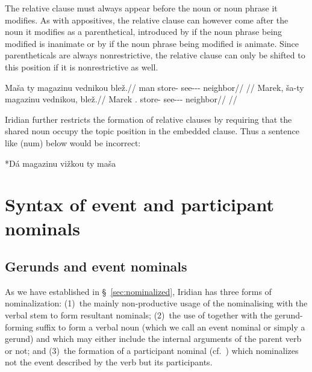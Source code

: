 The relative clause must always appear before the noun or noun phrase it
modifies. As with appositives, the relative clause can however come after the
noun it modifies as a parenthetical, introduced by  if the noun
phrase being modified is inanimate or by  if the noun phrase being
modified is animate. Since parentheticals are always nonrestrictive, the
relative clause can only be shifted to this position if it is nonrestrictive as
well.

\pex
\a\begingl
  \gla \ljudge{*}Maša ty magazinu vednikou blež.//
  \glb man \Lnk{} store-\Ins{} see-\Pv{}-\Pf{}-\Nz{} neighbor//
  \glft {}//
\endgl
\a\begingl
  \gla Marek, ša-ty magazinu vednikou, blež.//
  \glb Marek \Anim{}.\Lnk{} store-\Ins{} see-\Pv{}-\Pf{}-\Nz{} neighbor//
  \glft {}//
\endgl
\xe

Iridian further restricts the formation of relative clauses by requiring that
the shared noun occupy the topic position in the embedded clause. Thus  a
sentence like (num) below would be incorrect:

*Dá magazinu vižkou ty maša


\section{Syntax of event and participant nominals}\label{sec:nomz-syntax}

\subsection{Gerunds and event nominals}

As we have established in \S~\ref{sec:nominalized}, Iridian has three forms of
nominalization: (1)~the mainly non-productive usage of the
nominalising  with the verbal stem to form resultant nominals; (2)~the
use of  together with the gerund-forming suffix 
to form a verbal noun (which we call an event nominal or simply a gerund) and
which may either include the internal arguments of the parent verb or not; and
(3)~the formation of a participant nominal (cf.~\cite{okuna}) which nominalizes
not the event described by the verb but its participants.

